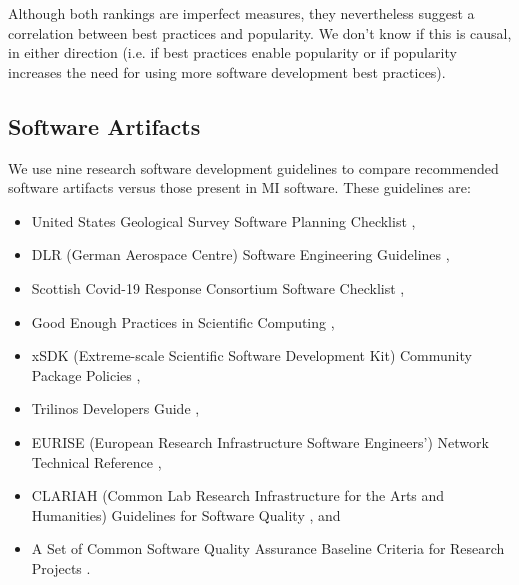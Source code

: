 \documentclass[final, 12pt, 3p, times]{elsarticle}
\begin{document}
Although both rankings are imperfect measures, they nevertheless suggest a
correlation between best practices and popularity. We don't know if this is
causal, in either direction (i.e. if best practices enable popularity or if
popularity increases the need for using more software development best
practices).

\subsection{Software Artifacts}
\label{Sec_CompareArtifacts}

We use nine research software development guidelines to compare recommended 
software artifacts versus those present in MI software.
These guidelines are:
\begin{itemize}
\item United States Geological Survey Software Planning Checklist
\cite{USGS2019},
\item DLR (German Aerospace Centre) Software Engineering Guidelines
\cite{TobiasEtAl2018}, 
\item Scottish Covid-19 Response Consortium Software Checklist
\cite{BrettEtAl2021},
\item Good Enough Practices in Scientific Computing \cite{WilsonEtAl2016},
\item xSDK (Extreme-scale Scientific Software Development Kit) Community Package
Policies \cite{SmithAndRoscoe2018},
\item Trilinos Developers Guide \cite{HerouxEtAl2008},
\item EURISE (European Research Infrastructure Software Engineers') Network
Technical Reference \cite{ThielEtAl2020},
\item CLARIAH (Common Lab Research Infrastructure for the Arts and Humanities)
Guidelines for Software Quality \cite{vanGompelEtAl2016}, and
\item A Set of Common Software Quality Assurance Baseline Criteria for Research
Projects \cite{OrvizEtAl2017}.
\end{itemize}
\end{document}
